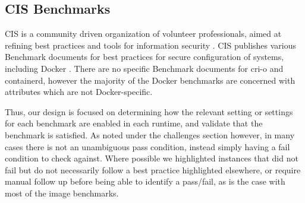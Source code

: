 \subsection*{CIS Benchmarks}
CIS is a community driven organization of volunteer professionals, aimed at refining best practices and tools for information security \cite{CIS_Communities}. CIS publishes various Benchmark documents for best practices for secure configuration of systems, including Docker \cite{CIS_Benchmarks}. There are no specific Benchmark documents for cri-o and containerd, however the majority of the Docker benchmarks are concerned with attributes which are not Docker-specific. 

Thus, our design is focused on determining how the relevant setting or settings for each benchmark are enabled in each runtime, and validate that the benchmark is satisfied. As noted under the challenges section however, in many cases there is not an unambiguous pass condition, instead simply having a fail condition to check against. Where possible we highlighted instances that did not fail but do not necessarily follow a best practice highlighted elsewhere, or require manual follow up before being able to identify a pass/fail, as is the case with most of the image benchmarks.




